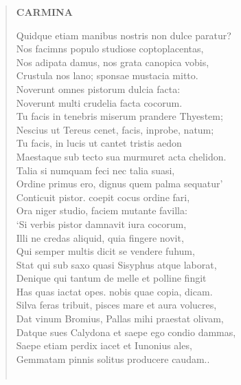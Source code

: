 \documentclass[11pt, a4paper]{report}
\begin{document}
\begin{verse}
    \begin{center} \textbf{CARMINA} \end{center} \marginpar{[168]} Quidque etiam manibus nostris non dulce paratur? \\ Nos facimns populo studiose coptoplacentas, \\ Nos adipata damus, nos grata canopica vobis, \\ Crustula nos lano; sponsae mustacia mitto. \\ Noverunt omnes pistorum dulcia facta: \\ Noverunt multi crudelia facta cocorum. \\ Tu facis in tenebris miserum prandere Thyestem; \\ Nescius ut Tereus cenet, facis, inprobe, natum; \\ Tu facis, in lucis ut cantet tristis aedon \\ Maestaque sub tecto sua murmuret acta chelidon. \\ Talia si numquam feci nec talia suasi, \\ Ordine primus ero, dignus quem palma sequatur’ \\ Conticuit pistor. coepit cocus ordine fari, \\ Ora niger studio, faciem mutante favilla: \\ ‘Si verbis pistor damnavit iura cocorum, \\ Illi ne credas aliquid, quia fingere novit, \\ Qui semper multis dicit se vendere fuhum, \\ Stat qui sub saxo quasi Sisyphus atque laborat, \\ Denique qui tantum de melle et polline fingit \\ Has quas iactat opes. nobis quae copia, dicam. \\ Silva feras tribuit, pisces mare et aura volucres, \\ Dat vinum Bromius, Pallas mihi praestat olivam, \\ Datque sues Calydona et saepe ego condio dammas, \\ Saepe etiam perdix iacet et Iunonius ales, \\ Gemmatam pinnis solitus producere caudam.. \\ 
        ﻿\pagebreak 

\end{verse}
\end{document}
